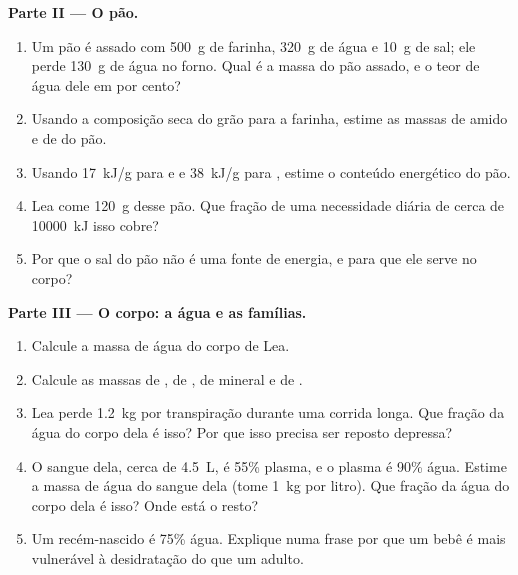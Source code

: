 \begin{problem}
\medskip
\noindent\textbf{Parte II --- O pão.}
\begin{enumerate}[resume]
  \item Um pão é assado com \qty{500}{g} de farinha, \qty{320}{g} de
        água e \qty{10}{g} de sal; ele perde \qty{130}{g} de água no
        forno. Qual é a massa do pão assado, e o teor de água dele em
        por cento?
  \item Usando a composição seca do grão para a farinha, estime as
        massas de amido e de  do pão.
  \item Usando \qty{17}{kJ/g} para  e  e
        \qty{38}{kJ/g} para , estime o conteúdo energético do
        pão.
  \item Lea come \qty{120}{g} desse pão. Que fração de uma necessidade
        diária de cerca de \qty{10000}{kJ} isso cobre?
  \item Por que o sal do pão não é uma fonte de energia, e para que ele
        serve no corpo?
\end{enumerate}

\medskip
\noindent\textbf{Parte III --- O corpo: a água e as famílias.}
\begin{enumerate}[resume]
  \item Calcule a massa de água do corpo de Lea.
  \item Calcule as massas de , de , de mineral e de
        .
  \item Lea perde \qty{1.2}{kg} por transpiração durante uma corrida
        longa. Que fração da água do corpo dela é isso? Por que isso
        precisa ser reposto depressa?
  \item O sangue dela, cerca de \qty{4.5}{L}, é 55\% plasma, e o plasma
        é 90\% água. Estime a massa de água do sangue dela (tome
        \qty{1}{kg} por litro). Que fração da água do corpo dela é
        isso? Onde está o resto?
  \item Um recém-nascido é 75\% água. Explique numa frase por que um
        bebê é mais vulnerável à desidratação do que um adulto.
\end{enumerate}


\end{problem}
